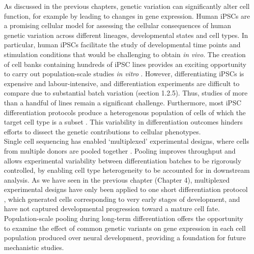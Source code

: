 As discussed in the previous chapters, genetic variation can significantly alter cell function, for example by leading to changes in gene expression. 
Human iPSCs are a promising cellular model for assessing the cellular consequences of human genetic variation across different lineages, developmental states and cell types. 
In particular, human iPSCs facilitate the study of developmental time points and stimulation conditions that would be challenging to obtain \textit{in vivo}. 
The creation of cell banks containing hundreds of iPSC lines \cite{kilpinen2017common} provides an exciting opportunity to carry out population-scale studies \textit{in vitro} \cite{cuomo2020single, strober2019dynamic, schwartzentruber2018molecular, alasoo2018shared}.
However, differentiating iPSCs is expensive and labour-intensive, and differentiation experiments are difficult to compare due to substantial batch variation (section 
1.2.5). 
Thus, studies of more than a handful of lines remain a significant challenge.
Furthermore, most iPSC differentiation protocols produce a heterogenous population of cells of which the target cell type is a subset \cite{d2019vitro, banovich2018impact, volpato2018reproducibility, nguyen2018single}. 
This variability in differentiation outcomes hinders efforts to dissect the genetic contributions to cellular phenotypes.\\

Single cell sequencing has enabled `multiplexed' experimental designs, where cells from multiple donors are pooled together \cite{cuomo2020single, nguyen2018single}. 
Pooling improves throughput and allows experimental variability between differentiation batches to be rigorously controlled, by enabling cell type heterogeneity to be accounted for in downstream analysis. 
As we have seen in the previous chapter (Chapter 
4), multiplexed experimental designs have only been applied to one short differentiation protocol \cite{cuomo2020single}, which generated cells corresponding to very early stages of development, and have not captured developmental progression toward a mature cell fate. 
Population-scale pooling during long-term differentiation offers the opportunity to examine the effect of common genetic variants on gene expression in each cell population produced over neural development, providing a foundation for future mechanistic studies.\\

